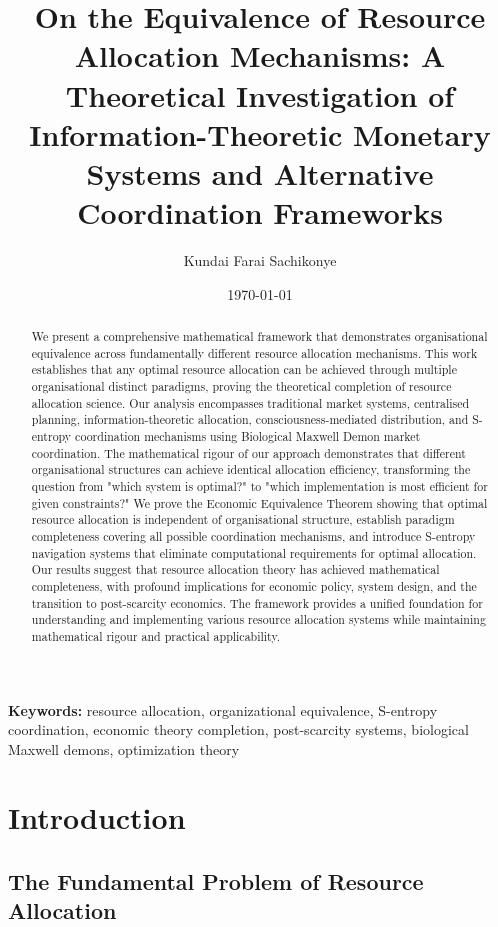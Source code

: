\documentclass[12pt,a4paper]{article}
\title{\textbf{On the Equivalence of Resource Allocation Mechanisms: A Theoretical Investigation of Information-Theoretic Monetary Systems and Alternative Coordination Frameworks}}
\author{Kundai Farai Sachikonye}
\date{\today}
\begin{document}
\maketitle

\begin{abstract}
We present a comprehensive mathematical framework that demonstrates organisational equivalence across fundamentally different resource allocation mechanisms. This work establishes that any optimal resource allocation can be achieved through multiple organisational distinct paradigms, proving the theoretical completion of resource allocation science. Our analysis encompasses traditional market systems, centralised planning, information-theoretic allocation, consciousness-mediated distribution, and S-entropy coordination mechanisms using Biological Maxwell Demon market coordination. The mathematical rigour of our approach demonstrates that different organisational structures can achieve identical allocation efficiency, transforming the question from "which system is optimal?" to "which implementation is most efficient for given constraints?" We prove the Economic Equivalence Theorem showing that optimal resource allocation is independent of organisational structure, establish paradigm completeness covering all possible coordination mechanisms, and introduce S-entropy navigation systems that eliminate computational requirements for optimal allocation. Our results suggest that resource allocation theory has achieved mathematical completeness, with profound implications for economic policy, system design, and the transition to post-scarcity economics. The framework provides a unified foundation for understanding and implementing various resource allocation systems while maintaining mathematical rigour and practical applicability.
\end{abstract}

\textbf{Keywords:} resource allocation, organizational equivalence, S-entropy coordination, economic theory completion, post-scarcity systems, biological Maxwell demons, optimization theory

\section{Introduction}

\subsection{The Fundamental Problem of Resource Allocation}
\end{document}

